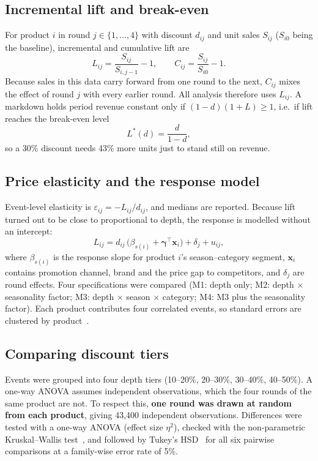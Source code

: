 \documentclass[11pt, a4paper]{article}
\begin{document}
\subsection{Incremental lift and break-even}
For product $i$ in round $j \in \{1,\dots,4\}$ with discount $d_{ij}$ and unit sales $S_{ij}$ ($S_{i0}$ being the baseline), incremental and cumulative lift are
\begin{equation}
L_{ij} = \frac{S_{ij}}{S_{i,j-1}} - 1, \qquad C_{ij} = \frac{S_{ij}}{S_{i0}} - 1 .
\end{equation}
Because sales in this data carry forward from one round to the next, $C_{ij}$ mixes the effect of round $j$ with every earlier round. All analysis therefore uses $L_{ij}$. A markdown holds period revenue constant only if $(1-d)(1+L) \geq 1$, i.e.\ if lift reaches the break-even level
\begin{equation}
L^{\ast}(d) = \frac{d}{1-d},
\end{equation}
so a 30\% discount needs 43\% more units just to stand still on revenue.

\subsection{Price elasticity and the response model}
Event-level elasticity is $\varepsilon_{ij} = -L_{ij}/d_{ij}$, and medians are reported. Because lift turned out to be close to proportional to depth, the response is modelled without an intercept:
\begin{equation}
L_{ij} = d_{ij}\,\bigl(\beta_{s(i)} + \boldsymbol{\gamma}^{\top}\mathbf{x}_i\bigr) + \delta_j + u_{ij},
\end{equation}
where $\beta_{s(i)}$ is the response slope for product $i$'s season--category segment, $\mathbf{x}_i$ contains promotion channel, brand and the price gap to competitors, and $\delta_j$ are round effects. Four specifications were compared (M1: depth only; M2: depth $\times$ seasonality factor; M3: depth $\times$ season $\times$ category; M4: M3 plus the seasonality factor). Each product contributes four correlated events, so standard errors are clustered by product~\cite{cameron}.

\subsection{Comparing discount tiers}
Events were grouped into four depth tiers (10--20\%, 20--30\%, 30--40\%, 40--50\%). A one-way ANOVA assumes independent observations, which the four rounds of the same product are not. To respect this, \textbf{one round was drawn at random from each product}, giving 43,400 independent observations. Differences were tested with a one-way ANOVA (effect size $\eta^2$), checked with the non-parametric Kruskal--Wallis test~\cite{kruskal}, and followed by Tukey's HSD~\cite{tukey} for all six pairwise comparisons at a family-wise error rate of 5\%.
\end{document}
